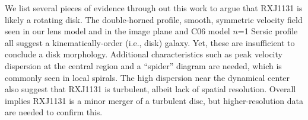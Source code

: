 \documentclass[]{emulateapj}
\begin{document}
We list several pieces of evidence through out
this work to argue that RXJ1131 is likely a rotating disk.
The double-horned profile, smooth, symmetric velocity field
seen in our lens model and in the
image plane and C06 model $n$=1 Sersic profile all suggest
a kinematically-order (i.e., disk) galaxy.
Yet, these are insufficient to conclude a disk morphology. Additional
characteristics such as peak velocity dispersion at the central region and a
``spider'' diagram are needed, which is commonly seen in local spirals.
The high dispersion near the dynamical center also
suggest that RXJ1131 is turbulent, albeit lack of spatial resolution. Overall
implies RXJ1131 is a minor merger of a turbulent disc, but higher-resolution
data are needed to confirm this.



\acknowledgments




\end{document}
